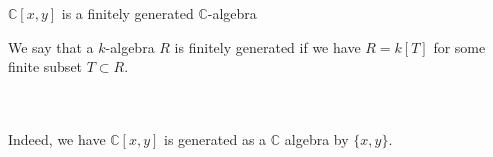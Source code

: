 \documentclass{beamer}
\newcommand{\C}{\mathbb{C}}
\begin{document}
\begin{frame}{$\C[x,y]$ is a finitely generated $\C$-algebra}
\begin{definition}
We say that a $k$-algebra $R$ is finitely generated if we have $R=k[T]$ for some finite subset $T\subset R$.
\end{definition}
\\~\\
Indeed, we have $\C[x,y]$ is generated as a $\C$ algebra by $\{x,y\}$.


\end{frame}
\end{document}
